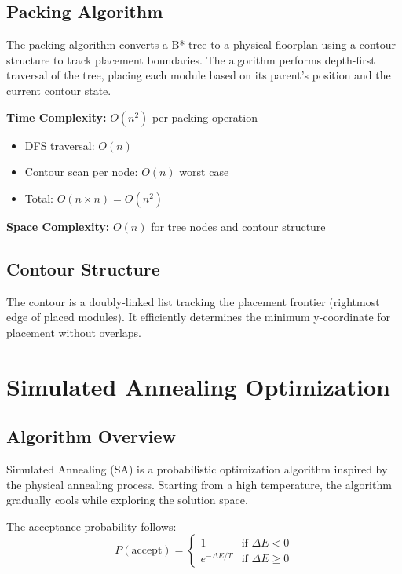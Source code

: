 \documentclass[11pt]{article}
\begin{document}
\subsection{Packing Algorithm}

The packing algorithm converts a B*-tree to a physical floorplan using a contour structure to track placement boundaries. The algorithm performs depth-first traversal of the tree, placing each module based on its parent's position and the current contour state.

\textbf{Time Complexity:} $O(n^2)$ per packing operation
\begin{itemize}
    \item DFS traversal: $O(n)$
    \item Contour scan per node: $O(n)$ worst case
    \item Total: $O(n \times n) = O(n^2)$
\end{itemize}

\textbf{Space Complexity:} $O(n)$ for tree nodes and contour structure

\subsection{Contour Structure}

The contour is a doubly-linked list tracking the placement frontier (rightmost edge of placed modules). It efficiently determines the minimum y-coordinate for placement without overlaps.

\section{Simulated Annealing Optimization}

\subsection{Algorithm Overview}

Simulated Annealing (SA) is a probabilistic optimization algorithm inspired by the physical annealing process. Starting from a high temperature, the algorithm gradually cools while exploring the solution space.

The acceptance probability follows:
\[
P(\text{accept}) = \begin{cases}
1 & \text{if } \Delta E < 0 \\
e^{-\Delta E / T} & \text{if } \Delta E \geq 0
\end{cases}
\]
\end{document}
